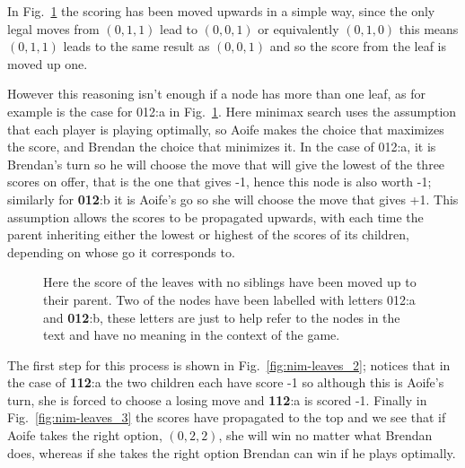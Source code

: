 \documentclass[11pt,a4paper]{scrartcl}
\begin{document}
In Fig.~\ref{fig:nim-leaves_1} the scoring has been moved upwards in a
simple way, since the only legal moves from $(0,1,1)$ lead to
$(0,0,1)$ or equivalently $(0,1,0)$ this means $(0,1,1)$ leads to the
same result as $(0,0,1)$ and so the score from the leaf is moved up
one. 

However this reasoning isn't enough if a node has more than one leaf,
as for example is the case for 012:a in
Fig.~\ref{fig:nim-leaves_1}. Here minimax search uses the
assumption that each player is playing optimally, so Aoife makes the
choice that maximizes the score, and Brendan the choice that minimizes
it. In the case of 012:a, it is Brendan's turn so he will choose the
move that will give the lowest of the three scores on offer, that is
the one that gives -1, hence this node is also worth -1; similarly for
\textbf{012}:b it is Aoife's go so she will choose the move that gives
+1. This assumption allows the scores to be propagated upwards, with
each time the parent inheriting either the lowest or highest of the
scores of its children, depending on whose go it corresponds to. 

\begin{figure}
\begin{center}
\end{center}
\caption{Here the score of the leaves with no siblings have been moved
  up to their parent. Two of the nodes have been labelled with letters
  012:a and \textbf{012}:b, these letters are just to help refer to
  the nodes in the text and have no meaning in the context of the
  game. \label{fig:nim-leaves_1}}
\end{figure}


The first step for this process is shown in
Fig.~\ref{fig:nim-leaves_2}; notices that in the case of
\textbf{112}:a the two children each have score -1 so although this is
Aoife's turn, she is forced to choose a losing move and \textbf{112}:a
is scored -1. Finally in Fig.~\ref{fig:nim-leaves_3} the scores have
propagated to the top and we see that if Aoife takes the right option,
$(0,2,2)$, she will win no matter what Brendan does, whereas if she
takes the right option Brendan can win if he plays optimally.
\end{document}
